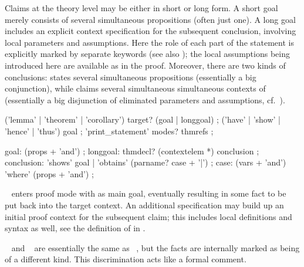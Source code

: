 \begin{isabellebody}
\begin{isamarkuptext}
  Claims at the theory level may be either in short or long form.  A
  short goal merely consists of several simultaneous propositions
  (often just one).  A long goal includes an explicit context
  specification for the subsequent conclusion, involving local
  parameters and assumptions.  Here the role of each part of the
  statement is explicitly marked by separate keywords (see also
  ); the local assumptions being introduced here
  are available as \mbox{} in the proof.  Moreover, there
  are two kinds of conclusions: \mbox{} states several
  simultaneous propositions (essentially a big conjunction), while
  \mbox{} claims several simultaneous simultaneous
  contexts of (essentially a big disjunction of eliminated parameters
  and assumptions, cf.\ ).

  \begin{rail}
    ('lemma' | 'theorem' | 'corollary') target? (goal | longgoal)
    ;
    ('have' | 'show' | 'hence' | 'thus') goal
    ;
    'print\_statement' modes? thmrefs
    ;
  
    goal: (props + 'and')
    ;
    longgoal: thmdecl? (contextelem *) conclusion
    ;
    conclusion: 'shows' goal | 'obtains' (parname? case + '|')
    ;
    case: (vars + 'and') 'where' (props + 'and')
    ;
  \end{rail}

  \begin{descr}
  
  \item [\mbox{\isa{\isacommand{lemma}}}~\isa{{\isachardoublequote}a{\isacharcolon}\ {\isasymphi}{\isachardoublequote}}] enters proof mode with
  \isa{{\isasymphi}} as main goal, eventually resulting in some fact \isa{{\isachardoublequote}{\isasymturnstile}\ {\isasymphi}{\isachardoublequote}} to be put back into the target context.  An additional
   specification may build up an initial proof
  context for the subsequent claim; this includes local definitions
  and syntax as well, see the definition of \mbox{} in
  .
  
  \item [\mbox{\isa{\isacommand{theorem}}}~\isa{{\isachardoublequote}a{\isacharcolon}\ {\isasymphi}{\isachardoublequote}} and \mbox{\isa{\isacommand{corollary}}}~\isa{{\isachardoublequote}a{\isacharcolon}\ {\isasymphi}{\isachardoublequote}}] are essentially the same as \mbox{}~, but the facts are internally marked as
  being of a different kind.  This discrimination acts like a formal
  comment.
  

\end{descr}
\end{isamarkuptext}
\end{isabellebody}
